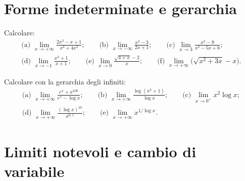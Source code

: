 \section{Forme indeterminate e gerarchia}

\begin{esercizio}[\liv{1}]
Calcolare:
\begin{gather*}
\text{(a) }\lim_{x\to+\infty}\frac{2x^3-x+1}{x^3+4x^2};\qquad \text{(b) }\lim_{x\to-\infty}\frac{x^2-3}{2x+1};\qquad \text{(c) }\lim_{x\to3}\frac{x^2-9}{x^2-5x+6};\\
\text{(d) }\lim_{x\to-1}\frac{x^3+1}{x+1};\qquad \text{(e) }\lim_{x\to0}\frac{\sqrt{4+x}-2}x;\qquad \text{(f) }\lim_{x\to+\infty}\bigl(\sqrt{x^2+3x}-x\bigr).
\end{gather*}
\end{esercizio}

\begin{esercizio}[\liv{2}]
Calcolare con la gerarchia degli infiniti:
\begin{gather*}
\text{(a) }\lim_{x\to+\infty}\frac{e^x+x^{100}}{e^x-\log x};\qquad \text{(b) }\lim_{x\to+\infty}\frac{\log(x^3+1)}{\log x};\qquad \text{(c) }\lim_{x\to0^+}x^2\log x;\\
\text{(d) }\lim_{x\to+\infty}\frac{(\log x)^{10}}{x^{0{,}1}};\qquad \text{(e) }\lim_{x\to+\infty}x^{1/\log x}.
\end{gather*}
\end{esercizio}

\section{Limiti notevoli e cambio di variabile}

